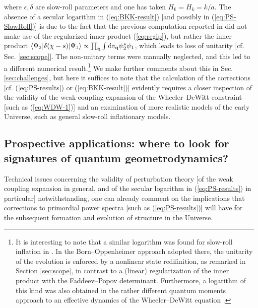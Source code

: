 \documentclass[12pt]{iopart}
\def\eref#1{(\ref{eq:#1})}
\def\D{\mathrm{d}}
\def\q{\mathbf{q}}
\begin{document}
where $\epsilon,\delta$ are slow-roll parameters and one has taken $H_0 = H_k = k/a$. The absence of a secular logarithm in \eref{BKK-result} [and possibly in \eref{PS-SlowRoll}] is due to the fact that the previous computation reported in \citet{Brizuela:2015tzl,Brizuela:2016gnz,Brizuela:2019jzv} did not make use of the regularized inner product \eref{regip}, but rather the inner product $\braket{\Psi_2|\delta(\chi-s)|\Psi_1} \propto \prod_{\q}\int\D v_{\q}\psi^*_2\psi_1$, which leads to loss of unitarity [cf. Sec. \ref{sec:scope}]. The non-unitary terms were manually neglected, and this led to a different numerical result.\footnote{It is interesting to note that a similar logarithm was found for slow-roll inflation in \citet{KTV3}. In the Born--Oppenheimer approach adopted there, the unitarity of the evolution is enforced by a nonlinear state redifinition, as remarked in Section \ref{sec:scope}, in contrast to a (linear) regularization of the inner product with the Faddeev--Popov determinant. Furthermore, a logarithm of this kind was also obtained in the rather different quantum moments approach to an effective dynamics of the Wheeler--DeWitt equation \citep{Brizuela:moment}.} We make further comments about this in Sec. \ref{sec:challenges}, but here it suffices to note that the calculation of the corrections [cf. \eref{PS-results} or \eref{BKK-result}] evidently requires a closer inspection of the validity of the weak-coupling expansion of the Wheeler--DeWitt constraint [such as \eref{WDW-1}] and an examination of more realistic models of the early Universe, such as general slow-roll inflationary models.

\subsection{\label{sec:signatures}Prospective applications: where to look for signatures of quantum geometrodynamics?}
Technical issues concerning the validity of perturbation theory [of the weak coupling expansion in general, and of the secular logarithm in \eref{PS-results} in particular] notwithstanding, one can already comment on the implications that corrections to primordial power spectra [such as \eref{PS-results}] will have for the subsequent formation and evolution of structure in the Universe.
\end{document}
